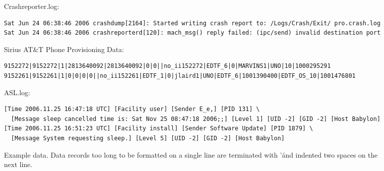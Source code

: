 \begin{figure*}
Crashreporter.log:
{\small \begin{verbatim}
Sat Jun 24 06:38:46 2006 crashdump[2164]: Started writing crash report to: /Logs/Crash/Exit/ pro.crash.log
Sat Jun 24 06:38:46 2006 crashreporterd[120]: mach_msg() reply failed: (ipc/send) invalid destination port
\end{verbatim}
}

Sirius AT\&T Phone Provisioning Data:
{\small \begin{verbatim}
9152272|9152272|1|2813640092|2813640092|0|0||no_ii152272|EDTF_6|0|MARVINS1|UNO|10|1000295291
9152261|9152261|1|0|0|0|0||no_ii152261|EDTF_1|0|jlaird1|UNO|EDTF_6|1001390400|EDTF_OS_10|1001476801
\end{verbatim}
}

ASL.log:
{\small  \begin{verbatim}
[Time 2006.11.25 16:47:18 UTC] [Facility user] [Sender E_e,] [PID 131] \
  [Message sleep cancelled time is: Sat Nov 25 08:47:18 2006;;] [Level 1] [UID -2] [GID -2] [Host Babylon]
[Time 2006.11.25 16:51:23 UTC] [Facility install] [Sender Software Update] [PID 1879] \
  [Message System requesting sleep.] [Level 5] [UID -2] [GID -2] [Host Babylon]
\end{verbatim}
}


\caption {Example data. 
Data records too long to be formatted on a single line are terminated with '\' and indented two spaces on the next line.}
\label{fig:example}
\end{figure*}

